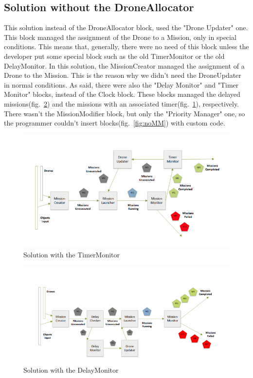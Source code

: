 \subsection{Solution without the DroneAllocator}


This solution instead of the DroneAllocator block, used the "Drone Updater" one. This block managed the assignment of the Drone to a Mission, only in special conditions. This means that, generally, there were no need of this block unless the developer put some special block such as the old TimerMonitor or the old DelayMonitor.
In this solution, the MissionCreator managed the assignment of a Drone to the Mission. This is the reason why we didn't need the DroneUpdater in normal conditions.
As said, there were also the "Delay Monitor" and "Timer Monitor" blocks, instead of the Clock block.
These blocks managed the delayed missions(fig.~\ref{fig:delayMonitor}) and the missions with an associated timer(fig.~\ref{fig:noClock}), respectively.
There wasn't the MissionModifier block, but only the "Priority Manager" one, so the programmer couldn't insert blocks(fig.~\ref{fig:noMM}) with custom code.

\begin{figure}[htb]
  \centering
  \includegraphics[width=\linewidth]{pictures/NoClock.png}
  \caption{Solution with the TimerMonitor}
  \label{fig:noClock}
\end{figure}


\begin{figure}[H]
  \centering
  \includegraphics[width=\linewidth]{pictures/DelayMonitor.png}
  \caption{Solution with the DelayMonitor}
  \label{fig:delayMonitor}
\end{figure}

